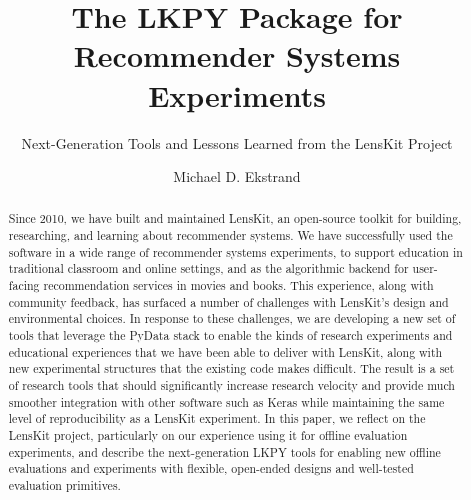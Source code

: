 \documentclass[sigconf,nonacm]{acmart}
\begin{document}
\title{The LKPY Package for  Recommender Systems Experiments}
\subtitle{Next-Generation Tools and Lessons Learned from the LensKit Project}

\author{Michael D. Ekstrand}


\begin{abstract}
Since 2010, we have built and maintained LensKit, an open-source toolkit for building, researching, and learning about recommender systems.
We have successfully used the software in a wide range of recommender systems experiments, to support education in traditional classroom and online settings, and as the algorithmic backend for user-facing recommendation services in movies and books.
This experience, along with community feedback, has surfaced a number of challenges with LensKit's design and environmental choices.
In response to these challenges, we are developing a new set of tools that leverage the PyData stack to enable the kinds of research experiments and educational experiences that we have been able to deliver with LensKit, along with new experimental structures that the existing code makes difficult.
The result is a set of research tools that should significantly increase research velocity and provide much smoother integration with other software such as Keras while maintaining the same level of reproducibility as a LensKit experiment.
In this paper, we reflect on the LensKit project, particularly on our experience using it for offline evaluation experiments, and describe the next-generation LKPY tools for enabling new offline evaluations and experiments with flexible, open-ended designs and well-tested evaluation primitives.
\end{abstract}

%
%
\end{document}
